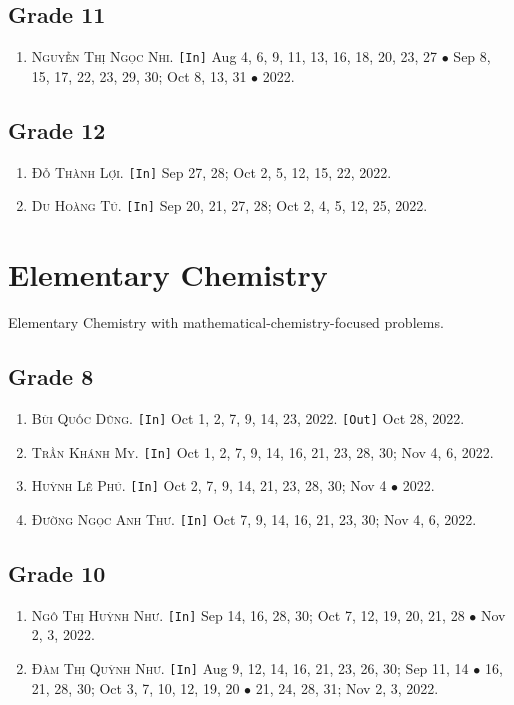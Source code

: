 \documentclass{article}
\numberwithin{equation}{section}
\begin{document}
\subsection{Grade 11}
\begin{enumerate}
	\item \textsc{Nguyễn Thị Ngọc Nhi.} \texttt{[In]} Aug 4, 6, 9, 11, 13, 16, 18, 20, 23, 27 $\bullet$ Sep 8, 15, 17, 22, 23, 29, 30; Oct 8, 13, 31 $\bullet$ 2022.
\end{enumerate}

\subsection{Grade 12}
\begin{enumerate}
	\item \textsc{Đỗ Thành Lợi.} \texttt{[In]} Sep 27, 28; Oct 2, 5, 12, 15, 22, 2022.
	\item \textsc{Du Hoàng Tú.} \texttt{[In]} Sep 20, 21, 27, 28; Oct 2, 4, 5, 12, 25, 2022.
\end{enumerate}


\section{Elementary Chemistry}
Elementary Chemistry with mathematical-chemistry-focused problems.

\subsection{Grade 8}
\begin{enumerate}
	\item \textsc{Bùi Quốc Dũng.} \texttt{[In]} Oct 1, 2, 7, 9, 14, 23, 2022. \texttt{[Out]} Oct 28, 2022.
	\item \textsc{Trần Khánh My.} \texttt{[In]} Oct 1, 2, 7, 9, 14, 16, 21, 23, 28, 30; Nov 4, 6, 2022.
	\item \textsc{Huỳnh Lê Phú.} \texttt{[In]} Oct 2, 7, 9, 14, 21, 23, 28, 30; Nov 4 $\bullet$ 2022.
	\item \textsc{Đường Ngọc Anh Thư.} \texttt{[In]} Oct 7, 9, 14, 16, 21, 23, 30; Nov 4, 6, 2022.
\end{enumerate}

\subsection{Grade 10}
\begin{enumerate}
	\item \textsc{Ngô Thị Huỳnh Như.} \texttt{[In]} Sep 14, 16, 28, 30; Oct 7, 12, 19, 20, 21, 28 $\bullet$ Nov 2, 3, 2022.
	\item \textsc{Đàm Thị Quỳnh Như.} \texttt{[In]} Aug 9, 12, 14, 16, 21, 23, 26, 30; Sep 11, 14 $\bullet$ 16, 21, 28, 30; Oct 3, 7, 10, 12, 19, 20 $\bullet$ 21, 24, 28, 31; Nov 2, 3, 2022.
\end{enumerate}
\end{document}
